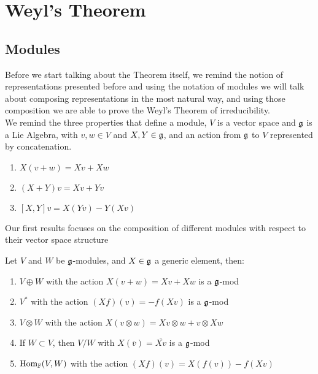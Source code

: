 \section{Weyl's Theorem}
\subsection*{Modules}
Before we start talking about the Theorem itself, we remind the notion of representations presented before and using the notation of modules we will talk about composing representations in the most natural way, and using those composition we are able to prove the Weyl's Theorem of irreducibility.\\
We remind the three properties that define a module, $V$ is a vector space and $\mathfrak{g}$ is a Lie Algebra, with $v,w \in V$ and $X,Y \in \mathfrak{g}$, and an action from $\mathfrak{g}$ to $V$ represented by concatenation.
\begin{enumerate}[label=\Alph*.]
	\item $X(v+w) = Xv+Xw$ 
	\item $(X+Y)v = Xv + Yv$
	\item $[X,Y]v = X(Yv) - Y(Xv)$
\end{enumerate}
Our first results focuses on the composition of different modules with respect to their vector space structure
\begin{prop}
	Let $V$ and $W$ be $\mathfrak{g}$-modules, and $X \in \mathfrak{g}$ a generic element, then:
	\begin{enumerate}
		\item $V \oplus W$ with the action $X(v+w) = Xv+Xw$ is a $\mathfrak{g}$-mod
		\item $V^*$ with the action $(Xf)(v) = -f(Xv)$ is a $\mathfrak{g}$-mod
		\item $V \otimes W$ with the action $X(v\otimes w) = Xv \otimes w + v \otimes Xw$
		\item If $W \subset V$, then $V/W$ with $X(\overline{v}) = \overline{Xv}$ is a $\mathfrak{g}$-mod
		\item $\text{Hom}_{\mathbb{F}}(V,W)$ with the action $(Xf)(v) = X(f(v)) - f(Xv) $
	\end{enumerate}
	\label{module composition}
\end{prop}
